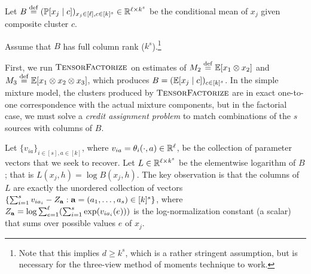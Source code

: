 Let $B \stackrel{\rm def}{=} (\mathbb{P}[x_j \mid c])_{x_j \in [\ell],c \in [k]^s} \in
\mathbb{R}^{\ell \times k^s}$ be the conditional mean of $x_j$ given composite cluster $c$.

\begin{assumption}
  Assume that $B$ has full column rank ($k^s$).\footnote{Note that this implies
  $d \ge k^s$, which is a rather stringent assumption, but is necessary for the
  three-view method of moments technique to work.}
\end{assumption}

First, we run $\text{\sc TensorFactorize}$ on estimates of
$M_2 \stackrel{\rm def}{=} \mathbb{E}[x_1 \otimes x_2]$ and $M_3 \stackrel{\rm def}{=} \mathbb{E}[x_1 \otimes x_2 \otimes x_3]$,
which produces $B = (\mathbb{E}[x_j \mid c])_{c \in [k]^s}$.
In the simple mixture model,
the clusters produced by $\text{\sc TensorFactorize}$ are in exact one-to-one correspondence
with the actual mixture components, but in the factorial case, we must solve
a \emph{credit assignment problem} to match combinations of the $s$ sources
with columns of $B$.

Let $\{ v_{ia} \}_{i \in [s], a \in [k]}$, where $v_{ia} = \theta_i(\cdot, a) \in \mathbb{R}^\ell$,
be the collection of parameter vectors that we seek to recover.
Let $L \in \mathbb{R}^{\ell \times k^s}$ be the elementwise logarithm of $B$; that is
$L(x_j, h) = \log B(x_j, h)$.
The key observation is that the columns of $L$ are exactly the unordered collection of vectors
$\{ \sum_{i=1}^s v_{ia_i} - Z_{\mathbf{a}} : \mathbf{a} = (a_1, \dots, a_s) \in [k]^s \}$,
where $Z_{\mathbf{a}} = \log \sum_{e=1}^\ell (\sum_{i=1}^s \exp(v_{ia_i}(e)))$ is the
log-normalization constant (a scalar) that sums over possible values $e$ of $x_j$.

